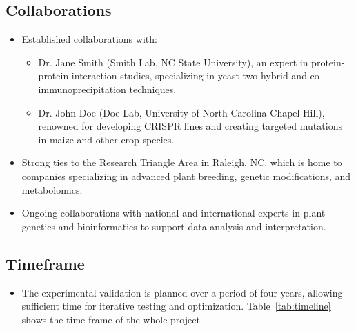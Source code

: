 \documentclass{article}
\begin{document}
\subsection{Collaborations}
\begin{itemize}
    \item Established collaborations with:
    \begin{itemize}
        \item Dr. Jane Smith (Smith Lab, NC State University), an expert in protein-protein interaction studies, specializing in yeast two-hybrid and co-immunoprecipitation techniques.
        \item Dr. John Doe (Doe Lab, University of North Carolina-Chapel Hill), renowned for developing CRISPR lines and creating targeted mutations in maize and other crop species.
    \end{itemize}
    \item Strong ties to the Research Triangle Area in Raleigh, NC, which is home to companies specializing in advanced plant breeding, genetic modifications, and metabolomics.
    \item Ongoing collaborations with national and international experts in plant genetics and bioinformatics to support data analysis and interpretation.
\end{itemize}

\subsection{Timeframe}
\begin{itemize}
    \item The experimental validation is planned over a period of four years, allowing sufficient time for iterative testing and optimization.
    Table~\ref{tab:timeline} shows the time frame of the whole project
\end{itemize}
\end{document}

